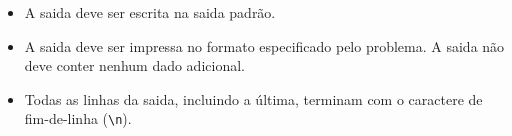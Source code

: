 \begin{itemize}

    \item A saida deve ser escrita na saida padrão.

    \item A saida deve ser impressa no formato especificado pelo problema. A saida não deve conter nenhum dado adicional.

	\item Todas as linhas da saida, incluindo a última, terminam com o caractere de fim-de-linha (\texttt{\textbackslash n}).

\end{itemize}




